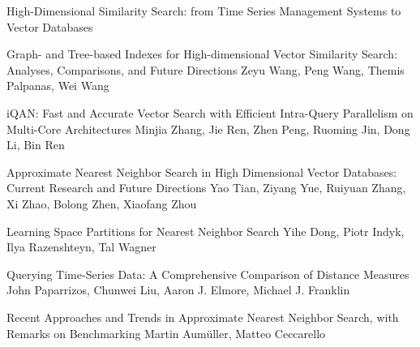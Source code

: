 \documentclass[11pt]{article}
\begin{document}
\begin{bulletin}
\begin{articlesection}{High-Dimensional Similarity Search: from Time Series Management Systems to Vector Databases}

% 

\begin{article}
{Graph- and Tree-based Indexes for High-dimensional Vector Similarity Search: Analyses, Comparisons, and Future Directions}
{Zeyu Wang, Peng Wang, Themis Palpanas, Wei Wang}

\end{article}
\begin{article}
{iQAN: Fast and Accurate Vector Search with Efficient Intra-Query Parallelism on Multi-Core Architectures}
{Minjia Zhang, Jie Ren, Zhen Peng, Ruoming Jin, Dong Li, Bin Ren}

\end{article}
\begin{article}
{Approximate Nearest Neighbor Search in High Dimensional Vector Databases: Current Research and Future Directions}
{Yao Tian, Ziyang Yue, Ruiyuan Zhang, Xi Zhao, Bolong Zhen, Xiaofang Zhou}

\end{article}
\begin{article}
{Learning Space Partitions for Nearest Neighbor Search}
{Yihe Dong, Piotr Indyk, Ilya Razenshteyn, Tal Wagner}

\end{article}
\begin{article}
{Querying Time-Series Data: A Comprehensive Comparison of Distance Measures}
{John Paparrizos, Chunwei Liu, Aaron J. Elmore, Michael J. Franklin}

\end{article}
\begin{article}
{Recent Approaches and Trends in Approximate Nearest Neighbor Search, with Remarks on Benchmarking}
{Martin Aum\"{u}ller, Matteo Ceccarello}

\end{article}
\end{articlesection}




\end{bulletin}
\end{document}
